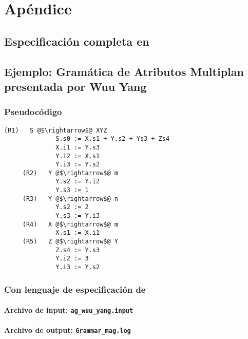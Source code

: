 \chapter{Apéndice}
\label{chap:appendix}

\section{Especificación completa en \spirit}
\label{append:grammarspirit}



\section{Ejemplo: Gramática de Atributos Multiplan presentada por Wuu Yang}
\label{append:agwuuyang}

\subsection{Pseudocódigo}
\begin{lstlisting}[basicstyle=\scriptsize, escapeinside=@@, backgroundcolor=\color{white}]
     (R1)   S @$\rightarrow$@ XYZ      
              S.s0 := X.s1 + Y.s2 + Ys3 + Zs4
              X.i1 := Y.s3  
              Y.i2 := X.s1
              Y.i3 := Y.s2
     (R2)   Y @$\rightarrow$@ m        
              Y.s2 := Y.i2
              Y.s3 := 1
     (R3)   Y @$\rightarrow$@ n        
              Y.s2 := 2
              Y.s3 := Y.i3
     (R4)   X @$\rightarrow$@ m        
              X.s1 := X.i1
     (R5)   Z @$\rightarrow$@ Y        
              Z.s4 := Y.s3
              Y.i2 := 3
              Y.i3 := Y.s2
\end{lstlisting} 

\subsection{Con lenguaje de especificación de \maggen}

\subsubsection{Archivo de input: \texttt{ag\_wuu\_yang.input}}


\subsubsection{Archivo de output: \texttt{Grammar\_mag.log}}


